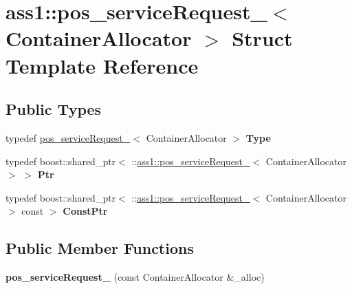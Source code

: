 \hypertarget{structass1_1_1pos__serviceRequest__}{}\section{ass1\+:\+:pos\+\_\+service\+Request\+\_\+$<$ Container\+Allocator $>$ Struct Template Reference}
\label{structass1_1_1pos__serviceRequest__}
\subsection*{Public Types}
\begin{DoxyCompactItemize}
\item 
\mbox{\label{structass1_1_1pos__serviceRequest___a622e66ad39fa820fa462f0e39508166f}} 
typedef \hyperlink{structass1_1_1pos__serviceRequest__}{pos\+\_\+service\+Request\+\_\+}$<$ Container\+Allocator $>$ {\bfseries Type}
\item 
\mbox{\label{structass1_1_1pos__serviceRequest___a3f7350aa3dc5a4a4c876836c1fc5c444}} 
typedef boost\+::shared\+\_\+ptr$<$ \+::\hyperlink{structass1_1_1pos__serviceRequest__}{ass1\+::pos\+\_\+service\+Request\+\_\+}$<$ Container\+Allocator $>$ $>$ {\bfseries Ptr}
\item 
\mbox{\label{structass1_1_1pos__serviceRequest___a5be66681e2af2f526826c1c400f2db7e}} 
typedef boost\+::shared\+\_\+ptr$<$ \+::\hyperlink{structass1_1_1pos__serviceRequest__}{ass1\+::pos\+\_\+service\+Request\+\_\+}$<$ Container\+Allocator $>$ const  $>$ {\bfseries Const\+Ptr}
\end{DoxyCompactItemize}
\subsection*{Public Member Functions}
\begin{DoxyCompactItemize}
\item 
\mbox{\label{structass1_1_1pos__serviceRequest___a17571337f7f9463dae52c4dadbcb4a6c}} 
{\bfseries pos\+\_\+service\+Request\+\_\+} (const Container\+Allocator \&\+\_\+alloc)
\end{DoxyCompactItemize}


